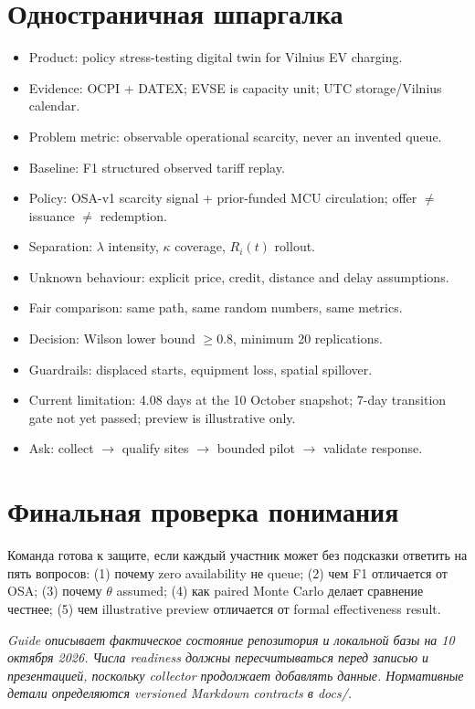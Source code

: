 \documentclass[11pt,a4paper]{article}
\begin{document}
\section{Одностраничная шпаргалка}
\begin{itemize}
\item Product: policy stress-testing digital twin for Vilnius EV charging.
\item Evidence: OCPI + DATEX; EVSE is capacity unit; UTC storage/Vilnius calendar.
\item Problem metric: observable operational scarcity, never an invented queue.
\item Baseline: F1 structured observed tariff replay.
\item Policy: OSA-v1 scarcity signal + prior-funded MCU circulation; offer $\neq$ issuance $\neq$ redemption.
\item Separation: $\lambda$ intensity, $\kappa$ coverage, $R_i(t)$ rollout.
\item Unknown behaviour: explicit price, credit, distance and delay assumptions.
\item Fair comparison: same path, same random numbers, same metrics.
\item Decision: Wilson lower bound $\ge 0.8$, minimum 20 replications.
\item Guardrails: displaced starts, equipment loss, spatial spillover.
\item Current limitation: 4.08 days at the 10 October snapshot; 7-day transition gate not yet passed; preview is illustrative only.
\item Ask: collect $\rightarrow$ qualify sites $\rightarrow$ bounded pilot $\rightarrow$ validate response.
\end{itemize}

\section{Финальная проверка понимания}
Команда готова к защите, если каждый участник может без подсказки ответить на пять вопросов: (1) почему zero availability не queue; (2) чем F1 отличается от OSA; (3) почему $\theta$ assumed; (4) как paired Monte Carlo делает сравнение честнее; (5) чем illustrative preview отличается от formal effectiveness result.

\vfill
\small\textit{Guide описывает фактическое состояние репозитория и локальной базы на 10 октября 2026. Числа readiness должны пересчитываться перед записью и презентацией, поскольку collector продолжает добавлять данные. Нормативные детали определяются versioned Markdown contracts в docs/.}
\end{document}
